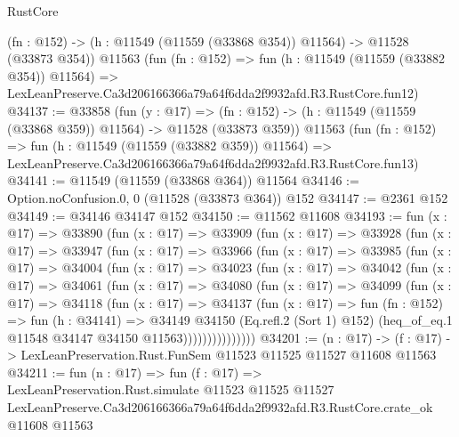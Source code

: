 \begin{lexlean}{RustCore}
\begin{coremodule}
    (fn : @152) -> (h : @11549 (@11559 (@33868 @354)) @11564) -> @11528 (@33873 @354))
    @11563
    (fun (fn : @152) =>
    fun (h : @11549 (@11559 (@33882 @354)) @11564) =>
    LexLeanPreserve.Ca3d206166366a79a64f6dda2f9932afd.R3.RustCore.fun12)
@34137 := @33858
    (fun (y : @17) =>
    (fn : @152) -> (h : @11549 (@11559 (@33868 @359)) @11564) -> @11528 (@33873 @359))
    @11563
    (fun (fn : @152) =>
    fun (h : @11549 (@11559 (@33882 @359)) @11564) =>
    LexLeanPreserve.Ca3d206166366a79a64f6dda2f9932afd.R3.RustCore.fun13)
@34141 := @11549 (@11559 (@33868 @364)) @11564
@34146 := Option.noConfusion.{0, 0} (@11528 (@33873 @364)) @152
@34147 := @2361 @152
@34149 := @34146 @34147 @152
@34150 := @11562 @11608
@34193 := fun (x : @17) =>
  @33890
    (fun (x : @17) =>
    @33909
      (fun (x : @17) =>
      @33928
        (fun (x : @17) =>
        @33947
          (fun (x : @17) =>
          @33966
            (fun (x : @17) =>
            @33985
              (fun (x : @17) =>
              @34004
                (fun (x : @17) =>
                @34023
                  (fun (x : @17) =>
                  @34042
                    (fun (x : @17) =>
                    @34061
                      (fun (x : @17) =>
                      @34080
                        (fun (x : @17) =>
                        @34099
                          (fun (x : @17) =>
                          @34118
                            (fun (x : @17) =>
                            @34137
                              (fun (x : @17) =>
                              fun (fn : @152) =>
                              fun (h : @34141) =>
                              @34149
                                @34150
                                (Eq.refl.{2} (Sort 1) @152)
                                (heq_of_eq.{1} @11548 @34147 @34150 @11563)))))))))))))))
@34201 := (n : @17) ->
  (f : @17) -> LexLeanPreservation.Rust.FunSem @11523 @11525 @11527 @11608 @11563
@34211 := fun (n : @17) =>
  fun (f : @17) =>
  LexLeanPreservation.Rust.simulate
    @11523
    @11525
    @11527
    LexLeanPreserve.Ca3d206166366a79a64f6dda2f9932afd.R3.RustCore.crate_ok
    @11608
    @11563
\end{coremodule}
\end{lexlean}
